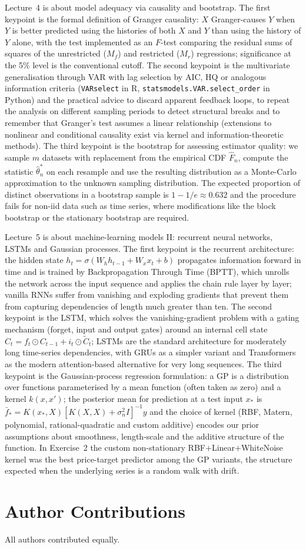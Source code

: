 \documentclass[12pt,a4paper]{article}
\newcommand{\probsection}[2]{\section{#2}}
\newcommand{\code}[1]{\texttt{#1}}
\begin{document}
Lecture~4 is about model adequacy via causality and bootstrap. The first keypoint is the formal definition of Granger causality: $X$ Granger-causes $Y$ when $Y$ is better predicted using the histories of both $X$ and $Y$ than using the history of $Y$ alone, with the test implemented as an $F$-test comparing the residual sums of squares of the unrestricted ($M_f$) and restricted ($M_r$) regressions; significance at the 5\% level is the conventional cutoff. The second keypoint is the multivariate generalisation through VAR with lag selection by AIC, HQ or analogous information criteria (\code{VARselect} in R, \code{statsmodels.VAR.select\_order} in Python) and the practical advice to discard apparent feedback loops, to repeat the analysis on different sampling periods to detect structural breaks and to remember that Granger's test assumes a linear relationship (extensions to nonlinear and conditional causality exist via kernel and information-theoretic methods). The third keypoint is the bootstrap for assessing estimator quality: we sample $m$ datasets with replacement from the empirical CDF $\widehat F_n$, compute the statistic $\hat\theta_n^*$ on each resample and use the resulting distribution as a Monte-Carlo approximation to the unknown sampling distribution. The expected proportion of distinct observations in a bootstrap sample is $1 - 1/e \approx 0.632$ and the procedure fails for non-iid data such as time series, where modifications like the block bootstrap or the stationary bootstrap are required.

Lecture~5 is about machine-learning models II: recurrent neural networks, LSTMs and Gaussian processes. The first keypoint is the recurrent architecture: the hidden state $h_t = \sigma(W_h h_{t-1} + W_x x_t + b)$ propagates information forward in time and is trained by Backpropagation Through Time (BPTT), which unrolls the network across the input sequence and applies the chain rule layer by layer; vanilla RNNs suffer from vanishing and exploding gradients that prevent them from capturing dependencies of length much greater than ten. The second keypoint is the LSTM, which solves the vanishing-gradient problem with a gating mechanism (forget, input and output gates) around an internal cell state $C_t = f_t \odot C_{t-1} + i_t \odot \tilde C_t$; LSTMs are the standard architecture for moderately long time-series dependencies, with GRUs as a simpler variant and Transformers as the modern attention-based alternative for very long sequences. The third keypoint is the Gaussian-process regression formulation: a GP is a distribution over functions parameterised by a mean function (often taken as zero) and a kernel $k(x, x')$; the posterior mean for prediction at a test input $x_*$ is $\bar f_* = K(x_*, X)[K(X, X) + \sigma_n^2 I]^{-1} y$ and the choice of kernel (RBF, Matern, polynomial, rational-quadratic and custom additive) encodes our prior assumptions about smoothness, length-scale and the additive structure of the function. In Exercise~2 the custom non-stationary RBF$+$Linear$+$WhiteNoise kernel was the best price-target predictor among the GP variants, the structure expected when the underlying series is a random walk with drift.

\probsection{5}{Author Contributions}

All authors contributed equally.
\end{document}
